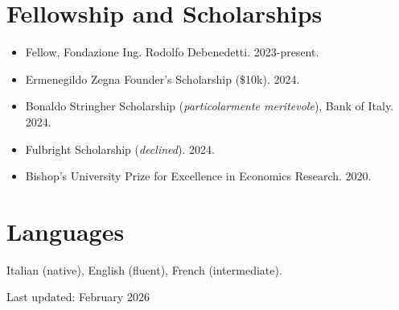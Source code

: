 \documentclass[letterpaper, 12pt]{article}
\begin{document}
\section*{Fellowship and Scholarships}
\begin{itemize}
\item[]  Fellow, Fondazione Ing. Rodolfo Debenedetti. 2023-present.
\item[]  Ermenegildo Zegna Founder's Scholarship (\$10k). 2024.
\item[] Bonaldo Stringher Scholarship (\textit{particolarmente meritevole}), Bank of Italy. 2024.
\item[]  Fulbright Scholarship (\textit{declined}). 2024.
\item[]  Bishop's University Prize for Excellence in Economics Research. 2020.
\end{itemize}
\smallskip
\section*{Languages}
Italian (native), English (fluent), French (intermediate).
\vspace{2cm}
\begin{center}
  Last updated: February 2026
\end{center}
 \thispagestyle{empty}
\end{document}
